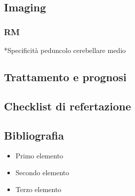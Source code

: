 \subsection{Imaging}
\subsubsection{RM}
*Specificità peduncolo cerebellare medio

\subsection{Trattamento e prognosi}

\subsection{Checklist di refertazione}

\subsection{Bibliografia}
\small{
	
	
}


\begin{itemize}[label=$\square$] %
	\item Primo elemento
	\item Secondo elemento
	\item Terzo elemento
\end{itemize}